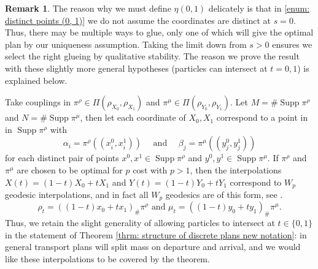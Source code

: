 \documentclass[11pt, oneside, titlepage]{book}
\theoremstyle{plain}
\theoremstyle{definition}
\newtheorem{remark}[theorem]{Remark}
\DeclareMathOperator{\supp}{Supp}
\begin{document}
\begin{remark}
\label{rmk: quadratic interpolants particles dont cross}
    The reason why we must define $\eta(0, 1)$ delicately is that in \ref{enum: distinct points (0, 1)} we do not assume the coordinates are distinct at $s = 0$. Thus, there may be multiple ways to glue, only one of which will give the optimal plan by our uniqueness assumption. Taking the limit down from $s>0$ ensures we select the right glueing by qualitative stability.  The reason we prove the result with these slightly more general hypotheses (particles can intersect at $t= 0, 1$) is explained below.

    Take couplings in $ \pi^\rho \in \Pi(\rho_{X_0}, \rho_{X_1})$ and $\pi^\mu \in \Pi(\rho_{Y_0}, \rho_{Y_1})$. Let $M = \# \supp \pi^\rho$ and $N = \#\supp \pi^\mu$, then let each coordinate of $X_0, X_1$ correspond to a point in in $\supp \pi^\rho$ with 
    \begin{equation*}
        \alpha_i = \pi^\rho((x^0_i, x^1_i)) \quad \text{ and } \quad \beta_j = \pi^\mu((y_j^0, y_j^1))
    \end{equation*}
    for each distinct pair of points $x^0, x^1 \in \supp \pi^\rho$ and $y^0, y^1 \in \supp \pi^\mu$.
    If $\pi^\rho$ and $\pi^\mu$ are chosen to be optimal for $p$ cost with $p>1$, then the interpolations $X(t) = (1-t) X_0 + t X_1$ and $Y(t) = (1-t) Y_0 + t Y_1$ correspond to $W_p$ geodesic interpolations, and in fact all $W_p$ geodesics are of this form, see \cite[Chapter 5]{santambrogio2015optimal}.
    \begin{equation*}
    \rho_t = ((1-t)x_0 + tx_1)_\#\pi^\rho \text{ and } \mu_t = ((1-t)y_0 + ty_1)_\#\pi^\mu.
    \end{equation*}
    Thus, we retain the slight generality of allowing particles to intersect at $t \in \{0, 1\}$ in the statement of Theorem \ref{thrm: structure of discrete plans new notation}: in general transport plans will split mass on departure and arrival, and we would like these interpolations to be covered by the theorem.
\end{remark}
\end{document}
